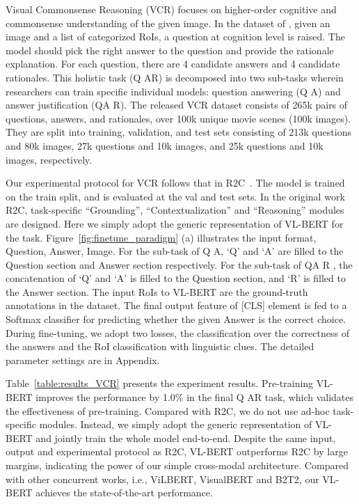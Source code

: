 \documentclass{article} \usepackage{iclr2020_conference,times}
\begin{document}
Visual Commonsense Reasoning (VCR) focuses on higher-order cognitive and commonsense understanding of the given image. In the dataset of \cite{zellers2019vcr}, given an image and a list of categorized RoIs, a question at cognition level is raised. The model should pick the right answer to the question and provide the rationale explanation. For each question, there are 4 candidate answers and 4 candidate rationales. This holistic task (Q  AR) is decomposed into two sub-tasks wherein researchers can train specific individual models: question answering (Q  A) and answer justification (QA  R). The released VCR dataset consists of 265k pairs of questions, answers, and rationales, over 100k unique movie scenes (100k images). They are split into training, validation, and test sets consisting of 213k questions and 80k images, 27k questions and 10k images, and 25k questions and 10k images, respectively.


Our experimental protocol for VCR follows that in R2C~\citep{zellers2019vcr}. The model is trained on the train split, and is evaluated at the val and test sets. In the original work R2C, task-specific ``Grounding'', ``Contextualization'' and ``Reasoning'' modules are designed. Here we simply adopt the generic representation of VL-BERT for the task. Figure~\ref{fig:finetune_paradigm} (a) illustrates the input format, Question, Answer, Image. For the sub-task of Q  A, `Q' and `A' are filled to the Question section and Answer section respectively.  For the sub-task of QA  R , the concatenation of `Q' and `A' is filled to the Question section, and `R' is filled to the Answer section. The input RoIs to VL-BERT are the ground-truth annotations in the dataset. The final output feature of [CLS] element is fed to a Softmax classifier for predicting whether the given Answer is the correct choice. During fine-tuning, we adopt two losses, the classification over the correctness of the answers and the RoI classification with linguistic clues. The detailed parameter settings are in Appendix.




Table~\ref{table:results_VCR} presents the experiment results. Pre-training VL-BERT improves the performance by 1.0\% in the final Q  AR task, which validates the effectiveness of pre-training.
Compared with R2C, we do not use ad-hoc task-specific modules. Instead, we simply adopt the generic representation of VL-BERT and jointly train the whole model end-to-end. Despite the same input, output and experimental protocol as R2C, VL-BERT outperforms R2C by large margins, indicating the power of our simple cross-modal architecture. Compared with other concurrent works, i.e., ViLBERT, VisualBERT and B2T2, our VL-BERT achieves the state-of-the-art performance.  
\end{document}
